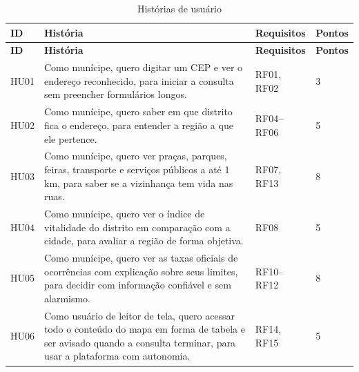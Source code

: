 \begin{longtable}{C{1.2cm}L{9.0cm}C{2.1cm}C{1.3cm}}
	\caption{Histórias de usuário}
	\label{qua:hu}                                                                                                                                                                                                                             \\
	\toprule
	\textbf{ID} & \textbf{História}                                                                                                                                                                    & \textbf{Requisitos} & \textbf{Pontos} \\
	\midrule
	\endfirsthead
	\toprule
	\textbf{ID} & \textbf{História}                                                                                                                                                                    & \textbf{Requisitos} & \textbf{Pontos} \\
	\midrule
	\endhead
	\bottomrule
	\endfoot
	HU01        & Como munícipe, quero digitar um CEP e ver o endereço reconhecido, para iniciar a consulta sem preencher formulários longos.                                                          & RF01, RF02          & 3               \\
	HU02        & Como munícipe, quero saber em que distrito fica o endereço, para entender a região a que ele pertence.                                                                               & RF04--RF06          & 5               \\
	HU03        & Como munícipe, quero ver praças, parques, feiras, transporte e serviços públicos a até 1 km, para saber se a vizinhança tem vida nas ruas.                                           & RF07, RF13          & 8               \\
	HU04        & Como munícipe, quero ver o índice de vitalidade do distrito em comparação com a cidade, para avaliar a região de forma objetiva.                                                     & RF08                & 5               \\
	HU05        & Como munícipe, quero ver as taxas oficiais de ocorrências com explicação sobre seus limites, para decidir com informação confiável e sem alarmismo.                                  & RF10--RF12          & 8               \\
	HU06        & Como usuário de leitor de tela, quero acessar todo o conteúdo do mapa em forma de tabela e ser avisado quando a consulta terminar, para usar a plataforma com autonomia.             & RF14, RF15          & 5               \\

\end{longtable}
